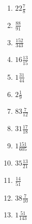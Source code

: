 \documentclass[12pt]{article}
\begin{document}
\begin{enumerate}
\item $ 22 \frac{7}{8} $
\item $ \frac{88}{91} $
\item $ \frac{152}{343} $
\item $ 16 \frac{13}{15} $
\item $ 1 \frac{31}{44} $
\item $ 2 \frac{1}{9} $
\item $ 83 \frac{7}{12} $
\item $ 31 \frac{17}{18} $
\item $ 1 \frac{151}{605} $
\item $ 35 \frac{13}{21} $
\item $ \frac{14}{51} $
\item $ 38 \frac{7}{10} $
\item $ 1 \frac{51}{143} $
\end{enumerate}
\newpage
\end{document}
